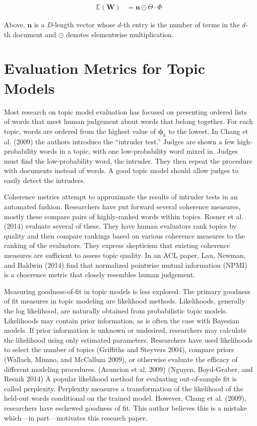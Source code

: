 \documentclass[conference,final,]{IEEEtran}
\begin{document}
\begin{align}
  \mathbb{E}(\mathbf{W}) &= \mathbf{n} \odot \Theta \cdot \Phi
\end{align}

Above, \(\mathbf{n}\) is a \(D\)-length vector whose \(d\)-th entry is
the number of terms in the \(d\)-th document and \(\odot\) denotes
elementwise multiplication.

\hypertarget{evaluation-metrics-for-topic-models}{%
\section{Evaluation Metrics for Topic
Models}\label{evaluation-metrics-for-topic-models}}

Most research on topic model evaluation has focused on presenting
ordered lists of words that meet human judgement about words that belong
together. For each topic, words are ordered from the highest value of
\(\boldsymbol\phi_k\) to the lowest. In Chang et al. (2009) the authors
introduce the ``intruder test.'' Judges are shown a few high-probability
words in a topic, with one low-probability word mixed in. Judges must
find the low-probability word, the intruder. They then repeat the
procedure with documents instead of words. A good topic model should
allow judges to easily detect the intruders.

Coherence metrics attempt to approximate the results of intruder tests
in an automated fashion. Researchers have put forward several coherence
measures, mostly these compare pairs of highly-ranked words within
topics. Rosner et al. (2014) evaluate several of these. They have human
evaluators rank topics by quality and then compare rankings based on
various coherence measures to the ranking of the evaluators. They
express skepticism that existing coherence measures are sufficient to
assess topic quality. In an ACL paper, Lau, Newman, and Baldwin (2014)
find that normalized pointwise mutual information (NPMI) is a choerence
metric that closely resembles human judgement.

Measuring goodness-of-fit in topic models is less explored. The primary
goodness of fit measures in topic modeling are likelihood methods.
Likelihoods, generally the log likelihood, are naturally obtained from
probabilistic topic models. Likelihoods may contain prior information,
as is often the case with Bayesian models. If prior information is
unknown or undesired, researchers may calculate the likelihood using
only estimated parameters. Researchers have used likelihoods to select
the number of topics (Griffiths and Steyvers 2004), compare priors
(Wallach, Mimno, and McCallum 2009), or otherwise evaluate the efficacy
of different modeling procedures. (Asuncion et al. 2009) (Nguyen,
Boyd-Graber, and Resnik 2014) A popular likelihood method for evaluating
out-of-sample fit is called perplexity. Perplexity measures a
transformation of the likelihood of the held-out words conditional on
the trained model. However, Chang et al. (2009), researchers have
eschewed goodness of fit. This author believes this is a mistake
which---in part---motivates this research paper.
\end{document}
